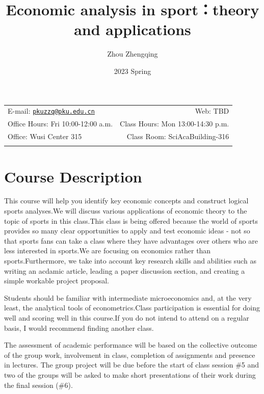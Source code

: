 \documentclass[11pt,]{article}
\title{Economic analysis in sport：theory and applications}
\author{Zhou Zhengqing}
\date{2023 Spring}
\begin{document}
		\maketitle
	

		\thispagestyle{firststyle}



	\noindent \begin{tabular*}{\textwidth}{ @{\extracolsep{\fill}} lr @{\extracolsep{\fill}}}


E-mail: \texttt{\href{mailto:pkuzzq@pku.edu.cn}{\nolinkurl{pkuzzq@pku.edu.cn}}} & Web: TBD\\
Office Hours: Fri 10:00-12:00 a.m.  &  Class Hours: Mon 13:00-14:30
p.m.\\
Office: Wusi Center 315  & Class Room: SciAcaBuilding-316\\
	&  \\
	\hline
	\end{tabular*}

\vspace{2mm}



\hypertarget{course-description}{%
\section{Course Description}\label{course-description}}

This course will help you identify key economic concepts and construct
logical sports analyses.We will discuss various applications of economic
theory to the topic of sports in this class.This class is being offered
because the world of sports provides so many clear opportunities to
apply and test economic ideas - not so that sports fans can take a class
where they have advantages over others who are less interested in
sports.We are focusing on economics rather than sports.Furthermore, we
take into account key research skills and abilities such as writing an
acdamic article, leading a paper discussion section, and creating a
simple workable project proposal.

Students should be familiar with intermediate microeconomics and, at the
very least, the analytical tools of econometrics.Class participation is
essential for doing well and scoring well in this course.If you do not
intend to attend on a regular basis, I would recommend finding another
class.

The assessment of academic performance will be based on the collective
outcome of the group work, involvement in class, completion of
assignments and presence in lectures. The group project will be due
before the start of class session \#5 and two of the groups will be
asked to make short presentations of their work during the final session
(\#6).
\end{document}

